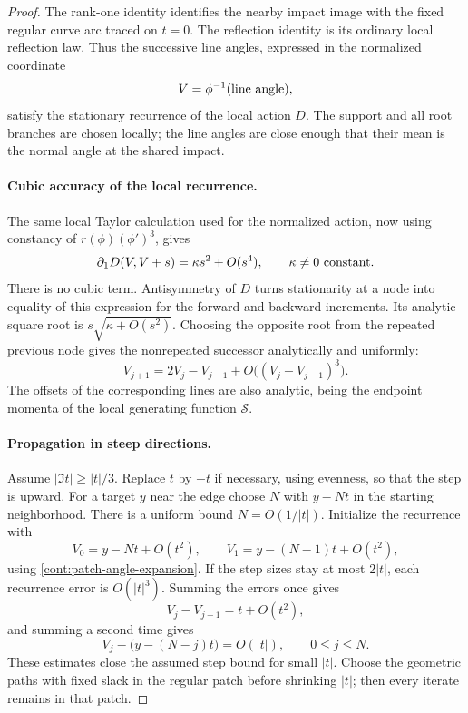\begin{proof}
The rank-one identity identifies the nearby impact image
with the fixed regular curve arc traced on \(t=0\).
The reflection identity is its ordinary local reflection
law.  Thus the successive line angles, expressed in the
normalized coordinate
\[
 V=\phi^{-1}(\hbox{line angle}),
\]
satisfy the stationary recurrence of the local action
\(D\).  The support and all root branches are chosen
locally; the line angles are close enough that their
mean is the normal angle at the shared impact.

\paragraph{Cubic accuracy of the local recurrence.}
The same local Taylor calculation used for the normalized
action, now using constancy of \(r(\phi)(\phi')^3\), gives
\[
 \partial_1D(V,V+s)=\kappa s^2+O(s^4),
 \qquad \kappa\ne0\ \hbox{constant}.
\]
There is no cubic term.  Antisymmetry of \(D\) turns
stationarity at a node into equality of this expression
for the forward and backward increments.  Its analytic
square root is \(s\sqrt{\kappa+O(s^2)}\).  Choosing the
opposite root from the repeated previous node gives the
nonrepeated successor analytically and uniformly:
\begin{equation}
 V_{j+1}=2V_j-V_{j-1}
                +O\bigl((V_j-V_{j-1})^3\bigr).
 \label{cont:steep-recurrence}
\end{equation}
The offsets of the corresponding lines are also analytic,
being the endpoint momenta of the local generating
function \(\mathcal S\).

\paragraph{Propagation in steep directions.}
Assume \(|\Im t|\ge |t|/3\).  Replace \(t\) by \(-t\)
if necessary, using evenness, so that the step is upward.
For a target \(y\) near the edge choose \(N\) with
\(y-Nt\) in the starting neighborhood.  There is a uniform
bound \(N=O(1/|t|)\).  Initialize the recurrence with
\[
 V_0=y-Nt+O(t^2),\qquad
 V_1=y-(N-1)t+O(t^2),
\]
using \eqref{cont:patch-angle-expansion}.
If the step sizes stay at most \(2|t|\), each recurrence
error is \(O(|t|^3)\).  Summing the errors once gives
\[
 V_j-V_{j-1}=t+O(t^2),
\]
and summing a second time gives
\[
 V_j-\bigl(y-(N-j)t\bigr)=O(|t|),
 \qquad 0\le j\le N.
\]
These estimates close the assumed step bound for small
\(|t|\).  Choose the geometric paths with fixed slack in
the regular patch before shrinking \(|t|\); then every
iterate remains in that patch.


\end{proof}
